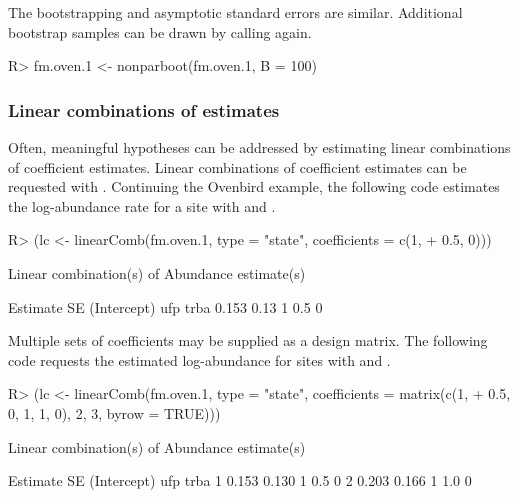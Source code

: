 \documentclass[article,shortnames]{jss}
\begin{document}
{The bootstrapping and asymptotic standard errors are similar. Additional
bootstrap samples can be drawn by calling  again.

\begin{Schunk}
\begin{Sinput}
R> fm.oven.1 <- nonparboot(fm.oven.1, B = 100)
\end{Sinput}
\end{Schunk}



\subsubsection{Linear combinations of estimates}

Often, meaningful hypotheses can be addressed by estimating linear
combinations of coefficient estimates.  Linear combinations of coefficient
estimates can be requested with . Continuing the Ovenbird
example, the following code estimates the log-abundance rate for a site with
 and .

\begin{Schunk}
\begin{Sinput}
R> (lc <- linearComb(fm.oven.1, type = "state", coefficients = c(1, 
+     0.5, 0)))
\end{Sinput}
\begin{Soutput}
Linear combination(s) of Abundance estimate(s)

 Estimate   SE (Intercept) ufp trba
    0.153 0.13           1 0.5    0
\end{Soutput}
\end{Schunk}

Multiple sets of coefficients may be supplied as a design matrix.  The
following code requests the estimated log-abundance for sites with
 and .

\begin{Schunk}
\begin{Sinput}
R> (lc <- linearComb(fm.oven.1, type = "state", coefficients = matrix(c(1, 
+     0.5, 0, 1, 1, 0), 2, 3, byrow = TRUE)))
\end{Sinput}
\begin{Soutput}
Linear combination(s) of Abundance estimate(s)

  Estimate    SE (Intercept) ufp trba
1    0.153 0.130           1 0.5    0
2    0.203 0.166           1 1.0    0
\end{Soutput}
\end{Schunk}

}
\end{document}

